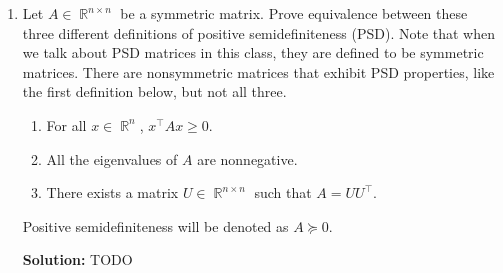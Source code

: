 \documentclass{article}
\DeclareMathOperator{\rank}{\mathrm{rank}}
\DeclareMathOperator{\R}{\mathbb{R}}
\newenvironment{solution}{\color{blue} \smallskip \textbf{Solution:}}{}
\begin{document}
\begin{enumerate}
\begin{solution}
\begin{enumerate}
        \item
        $A\R^n$ is $\text{Col}(A)$. \newline
        For any vector $v \in \R^n$, $A^\top Av \in A^\top A\R^n$: $\forall w \in \text{Null}(A)$, ($A^\top Av) \cdot w = (v^\top A^\top A)w = v^\top A^\top (A w) = \mathbf{0}$. So $A^\top Av \perp w$. That means $A^\top A\R^n \subseteq \text{Row}(A)$.
        Because $\rank (A^\top A) = \rank A$, $A^\top A\R^n = \text{Row}(A)$.
        \[ \qedhere \]

        \end{enumerate}  
    \end{solution}

    \item 
    Let $A \in \R^{n\times n}$ be a symmetric matrix.
    Prove equivalence between these three different definitions of positive semidefiniteness (PSD).
    Note that when we talk about PSD matrices in this class, they are defined to be symmetric matrices.
    There are nonsymmetric matrices that exhibit PSD properties, like the first definition below, but not all three.
    \begin{enumerate}
        \item For all $x\in\R^n$, $x^\top Ax\geq 0$.
        \item All the eigenvalues of $A$ are nonnegative.
        \item There exists a matrix $U\in\R^{n\times n}$ such that $A = UU^\top $.
    \end{enumerate}
    Positive semidefiniteness will be denoted as $A\succeq 0$. 
    
    \begin{solution}
        TODO
    \end{solution}


\end{enumerate}
\end{document}
